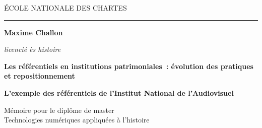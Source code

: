 \begin{titlepage}
		\begin{center}
			
			\bigskip
			
			\begin{large}
				\'ECOLE NATIONALE DES CHARTES
			\end{large}
			\begin{center}\rule{2cm}{0.02cm}\end{center}
			
			\bigskip
			\bigskip
			\bigskip
			\begin{Large}
				\textbf{Maxime Challon}\\
			\end{Large}
			\begin{normalsize} \textit{licencié ès histoire}
			\end{normalsize}
			
			\bigskip
			\bigskip
			\bigskip
			
			\begin{Huge}
				\textbf{Les référentiels en institutions patrimoniales : évolution des pratiques et repositionnement}\\
			\end{Huge}
			\bigskip
			\bigskip
			\begin{LARGE}
				\textbf{L’exemple des référentiels de l’Institut National de l’Audiovisuel}\\
			\end{LARGE}
			
			\bigskip
			\bigskip
			\bigskip
			\begin{large}
			\end{large}
			\vfill
			
			\begin{large}
				Mémoire 
				pour le diplôme de master \\
				\og{} Technologies numériques appliquées à l'histoire \fg{} \\
			\end{large}
			
		\end{center}
	\end{titlepage}

\thispagestyle{empty}	
\cleardoublepage